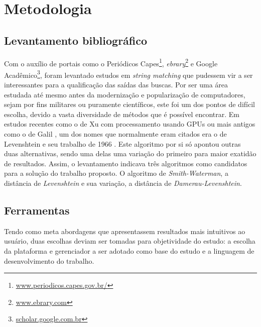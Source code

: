 \chapter{\nmu Metodologia} %
\label{cha:metodologia}


\section{Levantamento bibliográfico} %
\label{sec:levantamento_bibliogr_fico}

Com o auxílio de portais como o Periódicos Capes\footnote{\url{www.periodicos.capes.gov.br/}}, \textit{ebrary}\footnote{\url{www.ebrary.com}} e Google Acadêmico\footnote{\url{scholar.google.com.br}}, foram levantado estudos em \textit{string matching} que pudessem vir a ser interessantes para a qualificação das saídas das buscas.  Por ser uma área estudada até mesmo antes da modernização e popularização de computadores, sejam por fins militares ou puramente científicos, este foi um dos pontos de difícil escolha, devido a vasta diversidade de métodos que é possível encontrar. Em estudos recentes como o de Xu \cite{xu2013bit} com processamento usando GPUs ou mais antigos como o de Galil \cite{galil1988data}, um dos nomes que normalmente eram citados era o de Levenshtein e seu trabalho de 1966 \cite{levenshtein1966}. Este algoritmo por si só apontou outras duas alternativas, sendo uma delas uma variação do primeiro para maior exatidão de resultados. Assim, o levantamento indicava três algoritmos como candidatos para a solução do trabalho proposto. O algoritmo de \textit{Smith-Waterman}, a distância de \textit{Levenshtein} e sua variação, a distância de \textit{Damerau-Levenshtein}.



\section{Ferramentas} %
\label{sec:codifica_o}

Tendo como meta abordagens que apresentassem resultados mais intuitivos ao usuário, duas escolhas deviam ser tomadas para objetividade do estudo: a escolha da plataforma e gerenciador a ser adotado como base do estudo e a linguagem de desenvolvimento do trabalho.

